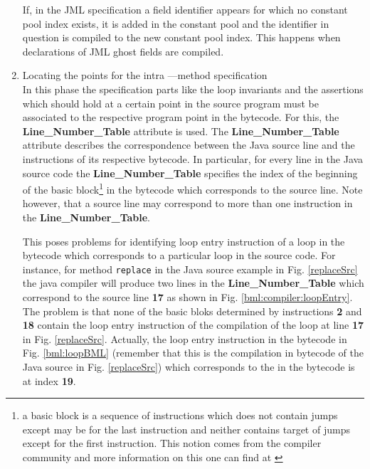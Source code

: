\begin{enumerate}
      If, in the JML specification a field
      identifier appears for which no constant pool index exists, it is added in the constant pool and the identifier in question
      is compiled to the new constant pool index. This happens when declarations of JML ghost fields are compiled. 
     

  





      

\item Locating the points for the intra ---method specification \\

      In this phase the specification parts like the loop invariants and the assertions
      which should hold at a certain point in the source program must be associated to the
      respective program point in the bytecode. For this, the 
      \textbf{Line\_Number\_Table} attribute is used. The \textbf{Line\_Number\_Table} attribute
      describes the correspondence between the Java source line and the instructions of its respective bytecode.
      In particular, for every line in the Java source code the   \textbf{Line\_Number\_Table}  specifies the index 
      of the beginning of the basic block\footnote{a basic block is a sequence of instructions which does not contain jumps except
	may be for the last instruction and neither contains target of jumps except for the first instruction. 
	This notion comes from the compiler community and 
	more information on this one can find at \cite{ARUCom1986}} in the bytecode which corresponds to the source line. 
      Note however, that a source line may correspond to more than one instruction in the \textbf{Line\_Number\_Table}. 
     
      This poses problems for  identifying loop entry instruction of a loop in the bytecode
      which corresponds to a particular loop in the source  code. %
       For instance, for method \texttt{replace} in
      the Java source example in Fig. \ref{replaceSrc} the java compiler will  produce two lines in the 
       \textbf{Line\_Number\_Table} which correspond to the source line \textbf{17}  as shown in Fig. \ref{bml:compiler:loopEntry}.
       The problem is that none of the basic bloks determined by instructions  \textbf{2} and  \textbf{18} contain the loop entry instruction of the compilation
       of the loop at line \textbf{17} in Fig. \ref{replaceSrc}. Actually, the loop entry instruction in the bytecode in 
       Fig. \ref{bml:loopBML} (remember that this is the compilation in bytecode of the Java source in Fig. \ref{replaceSrc}) which corresponds to the 
       in the bytecode is at index \textbf{19}.
  

\end{enumerate}
